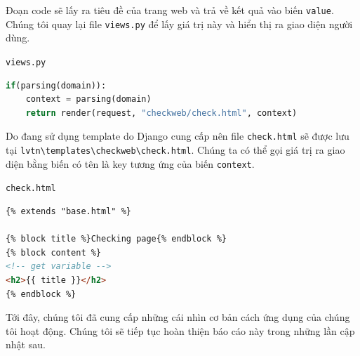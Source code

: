 \par
Đoạn code sẽ lấy ra tiêu đề của trang web và trả về kết quả vào biến \texttt{value}. Chúng tôi quay lại file \texttt{views.py} để lấy giá trị này và hiển thị ra giao diện người dùng.
\par
\texttt{views.py}
\begin{lstlisting}[language=Python]
if(parsing(domain)):
	context = parsing(domain)
	return render(request, "checkweb/check.html", context)
\end{lstlisting}
\par
Do đang sử dụng template do Django cung cấp nên file \texttt{check.html} sẽ được lưu tại \texttt{lvtn\textbackslash templates\textbackslash checkweb\textbackslash check.html}. Chúng ta có thể gọi giá trị ra giao diện bằng biến có tên là key tương ứng của biến \texttt{context}.
\par
\texttt{check.html}
\begin{lstlisting}[language=HTML]
{% extends "base.html" %}

{% block title %}Checking page{% endblock %}
{% block content %}
<!-- get variable -->
<h2>{{ title }}</h2>
{% endblock %}
\end{lstlisting}
\par
Tới đây, chúng tôi đã cung cấp những cái nhìn cơ bản cách ứng dụng của chúng tôi hoạt động. Chúng tôi sẽ tiếp tục hoàn thiện báo cáo này trong những lần cập nhật sau.